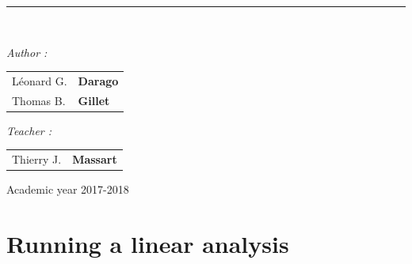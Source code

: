 \documentclass[12pt,a4paper]{article}
\newcommand\HRule{\rule{\textwidth}{1pt}}
\begin{document}
\begin{titlepage}
\begin{center}
\HRule \\[0.5cm]%





\begin{minipage}{0.45\textwidth}
\begin{flushleft} \large
\begin{doublespace}
\emph{Author : }\\
\end{doublespace}
\begin{tabular}{ll}
Léonard G.&\textbf{Darago}\\
Thomas B.&\textbf{Gillet}\\


\end{tabular}
\end{flushleft}
\end{minipage}
\begin{minipage}{0.45\textwidth}
\begin{flushleft} \large
\begin{doublespace}
\emph{Teacher : }\\ %
\end{doublespace}
\begin{tabular}{ll} 
Thierry J. &\textbf{Massart}\\



\end{tabular}
\end{flushleft}
\end{minipage}

\vfill

{\large Academic year 2017-2018}\\


\end{center}

\end{titlepage} 
\section*{Running a linear analysis}
\end{document}
